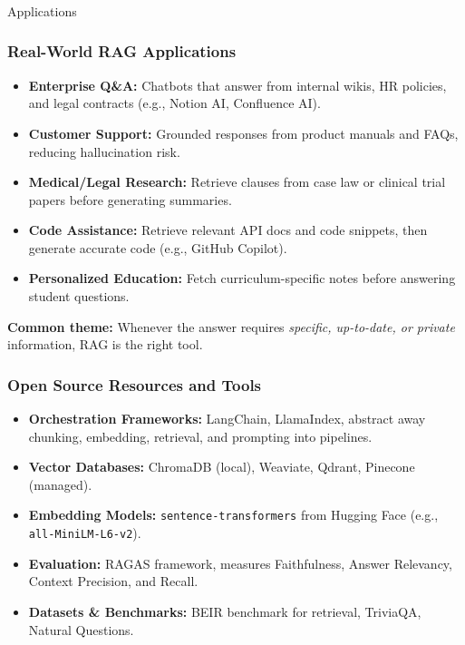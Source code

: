 
\begin{frame}[fragile]\frametitle{}
\begin{center}
{\Large Applications}
\end{center}
\end{frame}


\begin{frame}[fragile]\frametitle{Real-World RAG Applications}

\begin{itemize}
\item \textbf{Enterprise Q\&A:} Chatbots that answer from internal wikis, HR policies, and legal contracts (e.g., Notion AI, Confluence AI).
\item \textbf{Customer Support:} Grounded responses from product manuals and FAQs, reducing hallucination risk.
\item \textbf{Medical/Legal Research:} Retrieve clauses from case law or clinical trial papers before generating summaries.
\item \textbf{Code Assistance:} Retrieve relevant API docs and code snippets, then generate accurate code (e.g., GitHub Copilot).
\item \textbf{Personalized Education:} Fetch curriculum-specific notes before answering student questions.
\end{itemize}

\vspace{0.3em}
\textbf{Common theme:} Whenever the answer requires \textit{specific, up-to-date, or private} information, RAG is the right tool.

\end{frame}


\begin{frame}[fragile]\frametitle{Open Source Resources and Tools}

\begin{itemize}
\item \textbf{Orchestration Frameworks:} LangChain, LlamaIndex,  abstract away chunking, embedding, retrieval, and prompting into pipelines.
\item \textbf{Vector Databases:} ChromaDB (local), Weaviate, Qdrant, Pinecone (managed).
\item \textbf{Embedding Models:} \texttt{sentence-transformers} from Hugging Face (e.g., \texttt{all-MiniLM-L6-v2}).
\item \textbf{Evaluation:} RAGAS framework,  measures Faithfulness, Answer Relevancy, Context Precision, and Recall.
\item \textbf{Datasets \& Benchmarks:} BEIR benchmark for retrieval, TriviaQA, Natural Questions.
\end{itemize}

\end{frame}


